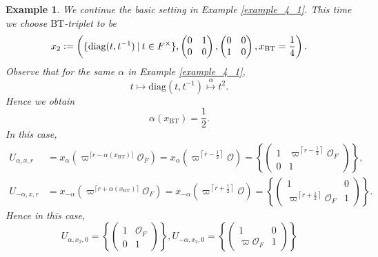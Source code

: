 \documentclass[10pt]{article}
\newtheorem{example}{Example}[section]
\numberwithin{equation}{theorem}
\newcommand{\defeq}{\vcentcolon=}
\newcommand{\Ouv}[0]{\mathcal{O}}
\newcommand{\BT}[0]{\mathrm{BT}}
\newcommand{\diag}[0]{\mathrm{diag}}
\newcommand{\sep}[0]{\:|\:}
\begin{document}
\begin{example}
    We continue the basic setting in Example \ref{example_4_1}. This time we choose $\BT$-triplet to be 
    \begin{equation*}
         x_2\defeq \left(\{\diag(t,t^{-1})\sep t\in F^\times\}, \begin{pmatrix}
            0 & 1 \\ 0 & 0
        \end{pmatrix},\begin{pmatrix}
            0 & 0 \\ 1 & 0
        \end{pmatrix}, x_{\mathrm{BT}}={\frac 1 4}\right).
    \end{equation*}
    Observe that for the same $\alpha$ in Example \ref{example_4_1}, 
    \begin{equation*}
        t\mapsto \diag(t,t^{-1})\stackrel{\alpha}{\mapsto}t^2.
    \end{equation*}
    Hence we obtain 
    \begin{equation*}
        \alpha(x_\BT) = {\frac 1 2}.
    \end{equation*}
    In this case, 
    \begin{align*}
        U_{\alpha,x,r} &= x_\alpha\left(\varpi^{\lceil r-\alpha(x_{\BT})\rceil}\Ouv_F\right) = x_\alpha\left(\varpi^{\left\lceil r-{\frac 1 2}\right\rceil}\Ouv\right) = \left\{\begin{pmatrix}
            1 & \varpi^{\left\lceil r-{\frac 1 2}\right\rceil}\Ouv_F\\ 0& 1
        \end{pmatrix}\right\},\\
        U_{-\alpha,x,r} &= x_{-\alpha}\left(\varpi^{\lceil r+\alpha(x_{\BT})\rceil}\Ouv_F\right) = x_{-\alpha}\left(\varpi^{\left\lceil r+{\frac 1 2}\right\rceil}\Ouv\right) = \left\{\begin{pmatrix}
            1 & 0\\ \varpi^{\left\lceil r+{\frac 1 2}\right\rceil}\Ouv_F& 1
        \end{pmatrix}\right\}.
    \end{align*}
    Hence in this case,
    \begin{equation*}
        U_{\alpha,x_2,0}=\left\{\begin{pmatrix}
        1& \Ouv_F\\  0 &1
        \end{pmatrix}\right\},U_{-\alpha,x_2,0}=\left\{\begin{pmatrix}
        1& 0\\  \varpi\Ouv_F & 1
        \end{pmatrix}\right\}
    \end{equation*}
    \label{example_4_2}
\end{example}
\end{document}
